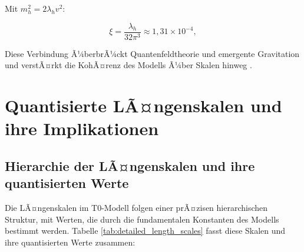 ﻿\documentclass[twocolumn,aps,prl]{revtex4-2}
\begin{document}
{{{{{{{{{										Mit \(m_h^2 = 2 \lambda_h v^2\):
										
										\begin{equation}
											\xi = \frac{\lambda_h}{32 \pi^3} \approx 1{,}31 \times 10^{-4}, \label{eq:xi_higgs}
										\end{equation}
										
										Diese Verbindung Ã¼berbrÃ¼ckt Quantenfeldtheorie und emergente Gravitation und verstÃ¤rkt die KohÃ¤renz des Modells Ã¼ber Skalen hinweg \cite{pascher_higgs_2025}.
										
										\section{Quantisierte LÃ¤ngenskalen und ihre Implikationen}
										\label{sec:length_scales}
										
										\subsection{Hierarchie der LÃ¤ngenskalen und ihre quantisierten Werte}
										\label{subsec:detailed_length_scales}
										
										Die LÃ¤ngenskalen im T0-Modell folgen einer prÃ¤zisen hierarchischen Struktur, mit Werten, die durch die fundamentalen Konstanten des Modells bestimmt werden. Tabelle \ref{tab:detailed_length_scales} fasst diese Skalen und ihre quantisierten Werte zusammen:
										
}}}}}}}}}
\end{document}
